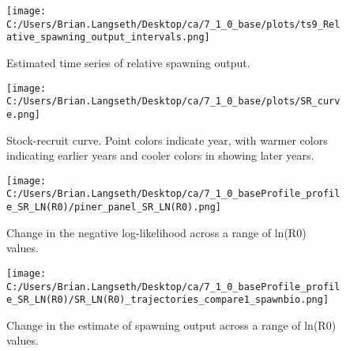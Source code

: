 \documentclass[11pt,
  english,
  a4paper,
]{article}
\begin{document}
\begin{figure}
\centering
\texttt{[image: C:/Users/Brian.Langseth/Desktop/ca/7\_1\_0\_base/plots/ts9\_Relative\_spawning\_output\_intervals.png]}
\caption{Estimated time series of relative spawning output.\label{fig:depl}}
\end{figure}

\tagmcend\tagstructend


\begin{figure}
\centering
\texttt{[image: C:/Users/Brian.Langseth/Desktop/ca/7\_1\_0\_base/plots/SR\_curve.png]}
\caption{Stock-recruit curve. Point colors indicate year, with warmer colors indicating earlier years and cooler colors in showing later years.\label{fig:bh-curve}}
\end{figure}

\tagmcend\tagstructend


\begin{figure}
\centering
\texttt{[image: C:/Users/Brian.Langseth/Desktop/ca/7\_1\_0\_baseProfile\_profile\_SR\_LN(R0)/piner\_panel\_SR\_LN(R0).png]}
\caption{Change in the negative log-likelihood across a range of ln(R0) values.\label{fig:r0-profile}}
\end{figure}

\tagmcend\tagstructend


\begin{figure}
\centering
\texttt{[image: C:/Users/Brian.Langseth/Desktop/ca/7\_1\_0\_baseProfile\_profile\_SR\_LN(R0)/SR\_LN(R0)\_trajectories\_compare1\_spawnbio.png]}
\caption{Change in the estimate of spawning output across a range of ln(R0) values.\label{fig:r0-ssb}}
\end{figure}

\tagmcend\tagstructend

\end{document}
